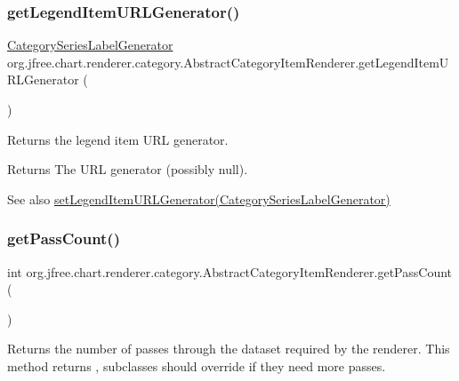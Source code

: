 \subsubsection{\texorpdfstring{get\+Legend\+Item\+U\+R\+L\+Generator()}{getLegendItemURLGenerator()}}
{\footnotesize\ttfamily \mbox{\hyperlink{interfaceorg_1_1jfree_1_1chart_1_1labels_1_1_category_series_label_generator}{Category\+Series\+Label\+Generator}} org.\+jfree.\+chart.\+renderer.\+category.\+Abstract\+Category\+Item\+Renderer.\+get\+Legend\+Item\+U\+R\+L\+Generator (\begin{DoxyParamCaption}{ }\end{DoxyParamCaption})}

Returns the legend item U\+RL generator.

\begin{DoxyReturn}{Returns}
The U\+RL generator (possibly {\ttfamily null}).
\end{DoxyReturn}
\begin{DoxySeeAlso}{See also}
\mbox{\hyperlink{classorg_1_1jfree_1_1chart_1_1renderer_1_1category_1_1_abstract_category_item_renderer_a27aede0810b3802871923f1b20c59604}{set\+Legend\+Item\+U\+R\+L\+Generator(\+Category\+Series\+Label\+Generator)}} 
\end{DoxySeeAlso}
\mbox{\label{classorg_1_1jfree_1_1chart_1_1renderer_1_1category_1_1_abstract_category_item_renderer_a9386cde1d834a511647d468b68976f64}} 
\subsubsection{\texorpdfstring{get\+Pass\+Count()}{getPassCount()}}
{\footnotesize\ttfamily int org.\+jfree.\+chart.\+renderer.\+category.\+Abstract\+Category\+Item\+Renderer.\+get\+Pass\+Count (\begin{DoxyParamCaption}{ }\end{DoxyParamCaption})}

Returns the number of passes through the dataset required by the renderer. This method returns {}, subclasses should override if they need more passes.

